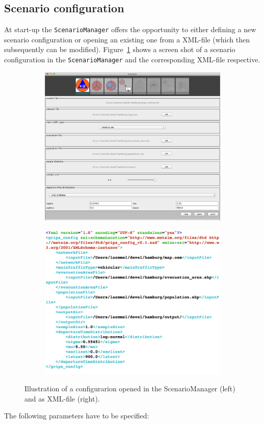 \subsection{Scenario configuration}


 At start-up the \verb+ScenarioManager+ offers the opportunity to either defining a new scenario configuration or opening an existing one from a XML-file (which then subsequently can be modified). Figure~\ref{chap:evac:fig:sc_man} shows a screen shot of a scenario configuration in the \verb+ScenarioManager+ and the corresponding XML-file respective.

\begin{figure}[!ht]
\begin{subfigure}
\centering
\includegraphics[width=.475\linewidth]{extending/figures/Evacuation/grips_config}
\end{subfigure}\hfill
\begin{subfigure}
\centering
\includegraphics[width=.475\linewidth]{extending/figures/Evacuation/grips_config_xml}
\end{subfigure}
\caption{Illustration of a configurarion opened in the \mbox{ScenarioManager} (left) and as XML-file (right).}\label{chap:evac:fig:sc_man}
\end{figure}
The following parameters have to be specified:
